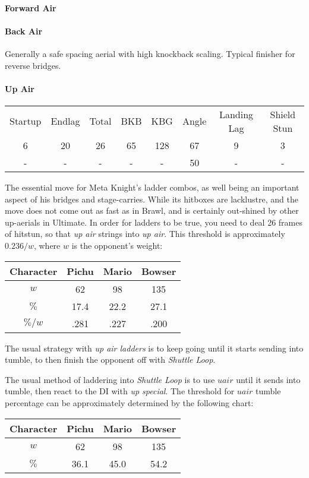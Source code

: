 \paragraph{Forward Air}
\paragraph{Back Air}
Generally a safe spacing aerial with high knockback scaling. Typical finisher for reverse bridges.
\paragraph{Up Air}
\begin{center}
	\begin{tabular}{| c  c  c | c  c  c | c  c |}
		\hline
		Startup	& Endlag & Total & BKB & KBG & Angle &	Landing Lag	&	Shield Stun	\\
		6	&	20	&	26	&	65	&	128 & 	67\deg	&	9 	&	3	\\
		-	&	-	&	-	&	- 	& 	- 	&	50\deg	&	-	&	-	\\
		\hline
	\end{tabular}
\end{center}
The essential move for Meta Knight's ladder combos, as well  being an important aspect of his bridges and stage-carries. While its hitboxes are lacklustre, and the move does not come out as fast as in Brawl, and is certainly out-shined by other up-aerials in Ultimate. In order for ladders to be true, you need to deal 26 frames of hitstun, so that \textit{up air} strings into \emph{up air}. This threshold is approximately $0.236/w$, where $w$ is the opponent's weight:
\begin{center}
	\begin{tabular}{| c c c c |}
		\hline
		\textbf{Character} & Pichu & Mario & Bowser	\\
		\hline
		$w$		&	62		&	98		&	135		\\
		$\%$	&	17.4	&	22.2	&	27.1	\\
		$\%/w$	&	.281	&	.227	&	.200	\\
		\hline
	\end{tabular}
\end{center}
The usual strategy with \textit{up air ladders} is to keep going until it starts sending into tumble, to then finish the opponent off with \textit{Shuttle Loop}.

The usual method of laddering into \textit{Shuttle Loop} is to use $uair$ until it sends into tumble, then react to the DI with \textit{up special}.
The threshold for $uair$ tumble percentage can be approximately determined by the following chart:
\begin{center}
	\begin{tabular}{| c c c c |}
		\hline
		\textbf{Character} & Pichu & Mario & Bowser	\\
		\hline
		$w$		&	62		&	98		&	135		\\
		$\%$	&	36.1	&	45.0	&	54.2	\\
		\hline
	\end{tabular}
\end{center}


